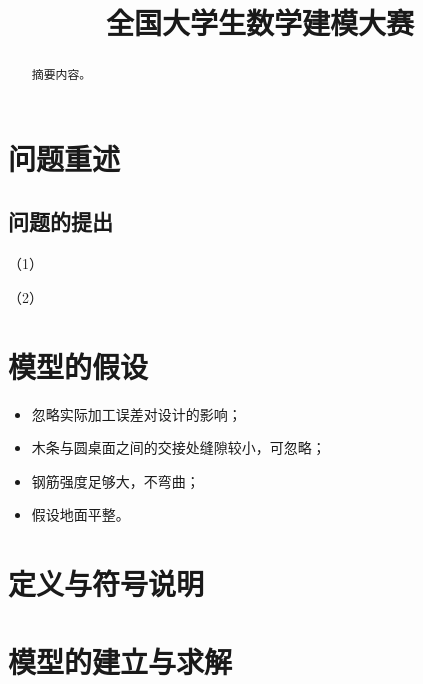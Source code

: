 

\usepackage{url}
\title{全国大学生数学建模大赛}



\maketitle
\begin{abstract}
  摘要内容。

\end{abstract}

\tableofcontents

\section{问题重述}



\subsection*{问题的提出}
（1）

（2）
\section{模型的假设}

\begin{itemize}
\item 忽略实际加工误差对设计的影响；
\item 木条与圆桌面之间的交接处缝隙较小，可忽略；
\item 钢筋强度足够大，不弯曲；
\item 假设地面平整。
\end{itemize}

\section{定义与符号说明}
\begin{center}
\end{center}

\section{模型的建立与求解}

